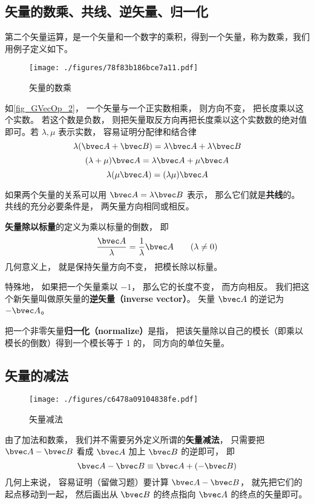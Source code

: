 \subsection{矢量的数乘、共线、逆矢量、归一化}\label{sub_GVecOp_1}
第二个矢量运算，是一个矢量和一个数字的乘积，得到一个矢量，称为数乘，我们用例子定义如下。

\begin{figure}[ht]
\centering
\texttt{[image: ./figures/78f83b186bce7a11.pdf]}
\caption{矢量的数乘} \label{fig_GVecOp_2}
\end{figure}

如\autoref{fig_GVecOp_2}， 一个矢量与一个正实数相乘， 则方向不变， 把长度乘以这个实数。 若这个数是负数， 则把矢量取反方向再把长度乘以这个实数数的绝对值即可。若 $\lambda, \mu$ 表示实数， 容易证明分配律和结合律
\begin{equation}
\lambda(\bvec A + \bvec B) = \lambda\bvec A + \lambda\bvec B
\end{equation}
\begin{equation}
(\lambda+\mu)\bvec A = \lambda\bvec A + \mu\bvec A
\end{equation}
\begin{equation}
\lambda(\mu\bvec A) = (\lambda\mu) \bvec A
\end{equation}

如果两个矢量的关系可以用 $\bvec A = \lambda\bvec B$ 表示， 那么它们就是\textbf{共线}的。 共线的充分必要条件是， 两矢量方向相同或相反。

\textbf{矢量除以标量}的定义为乘以标量的倒数， 即
\begin{equation}
\frac{\bvec A}{\lambda} = \frac{1}{\lambda} \bvec A \qquad (\lambda \ne 0)
\end{equation}
几何意义上， 就是保持矢量方向不变， 把模长除以标量。

特殊地， 如果把一个矢量乘以 $-1$， 那么它的长度不变， 而方向相反。 我们把这个新矢量叫做原矢量的\textbf{逆矢量（inverse vector）}。 矢量 $\bvec A$ 的逆记为 $-\bvec A$。

把一个非零矢量\textbf{归一化（normalize）}是指， 把该矢量除以自己的模长（即乘以模长的倒数）得到一个模长等于 1 的， 同方向的单位矢量。

\subsection{矢量的减法}

\begin{figure}[ht]
\centering
\texttt{[image: ./figures/c6478a09104838fe.pdf]}
\caption{矢量减法} \label{fig_GVecOp_3}
\end{figure}
由了加法和数乘， 我们并不需要另外定义所谓的\textbf{矢量减法}， 只需要把 $\bvec A - \bvec B$ 看成 $\bvec A$ 加上 $\bvec B$ 的逆即可， 即
\begin{equation}
\bvec A - \bvec B \equiv \bvec A + (-\bvec B)
\end{equation}
几何上来说， 容易证明（留做习题）要计算 $\bvec A - \bvec B$， 就先把它们的起点移动到一起， 然后画出从 $\bvec B$ 的终点指向 $\bvec A$ 的终点的矢量即可。


